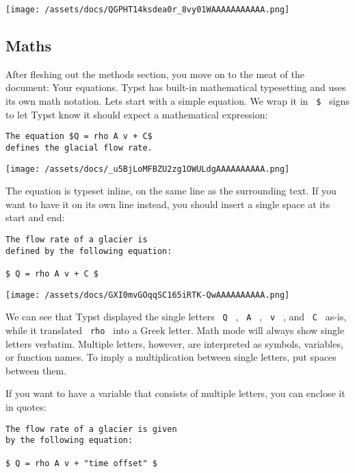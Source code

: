 \texttt{[image: /assets/docs/QGPHT14ksdea0r\_8vy01WAAAAAAAAAAA.png]}

\subsection{Maths}\label{maths}

After fleshing out the methods section, you move on to the meat of the
document: Your equations. Typst has built-in mathematical typesetting
and uses its own math notation. Let\textquotesingle s start with a
simple equation. We wrap it in \texttt{\ \$\ } signs to let Typst know
it should expect a mathematical expression:

\begin{verbatim}
The equation $Q = rho A v + C$
defines the glacial flow rate.
\end{verbatim}

\texttt{[image: /assets/docs/\_u5BjLoMFBZU2zg1OWULdgAAAAAAAAAA.png]}

The equation is typeset inline, on the same line as the surrounding
text. If you want to have it on its own line instead, you should insert
a single space at its start and end:

\begin{verbatim}
The flow rate of a glacier is
defined by the following equation:

$ Q = rho A v + C $
\end{verbatim}

\texttt{[image: /assets/docs/GXI0mvGOqqSC165iRTK-QwAAAAAAAAAA.png]}

We can see that Typst displayed the single letters \texttt{\ Q\ } ,
\texttt{\ A\ } , \texttt{\ v\ } , and \texttt{\ C\ } as-is, while it
translated \texttt{\ rho\ } into a Greek letter. Math mode will always
show single letters verbatim. Multiple letters, however, are interpreted
as symbols, variables, or function names. To imply a multiplication
between single letters, put spaces between them.

If you want to have a variable that consists of multiple letters, you
can enclose it in quotes:

\begin{verbatim}
The flow rate of a glacier is given
by the following equation:

$ Q = rho A v + "time offset" $
\end{verbatim}

